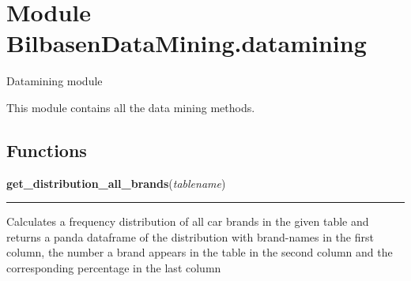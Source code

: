 %
%
%


\section{Module BilbasenDataMining.datamining}

    \label{BilbasenDataMining:datamining}
Datamining module

This module contains all the data mining methods.



  \subsection{Functions}

    \label{BilbasenDataMining:datamining:get_distribution_all_brands}

    \vspace{0.5ex}

\hspace{.8\funcindent}\begin{boxedminipage}{\funcwidth}

    \raggedright \textbf{get\_distribution\_all\_brands}(\textit{tablename})

    \vspace{-1.5ex}

    \rule{\textwidth}{0.5\fboxrule}
\setlength{\parskip}{2ex}
    Calculates a frequency distribution of all car brands in the given 
    table and returns a panda dataframe of the distribution with 
    brand-names in the first column, the number a brand appears in the 
    table in the second column and the corresponding percentage in the last
    column

\setlength{\parskip}{1ex}
    \end{boxedminipage}

